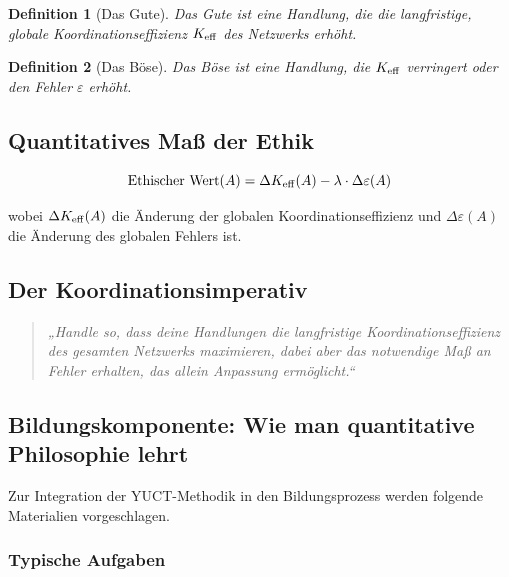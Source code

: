 \documentclass[12pt,a4paper]{article}
\newcommand{\eps}{\varepsilon}
\newtheorem{definition}{Definition}[section]
\begin{document}
	\begin{definition}[Das Gute]
		Das Gute ist eine Handlung, die die langfristige, globale Koordinationseffizienz \(\Keff\) des Netzwerks erhöht.
	\end{definition}
	
	\begin{definition}[Das Böse]
		Das Böse ist eine Handlung, die \(\Keff\) verringert oder den Fehler \(\eps\) erhöht.
	\end{definition}
	
	\subsection{Quantitatives Maß der Ethik}
	
	\begin{equation}
		\text{Ethischer Wert}(A) = \Delta \Keff(A) - \lambda \cdot \Delta \eps(A)
	\end{equation}
	
	wobei \(\Delta \Keff(A)\) die Änderung der globalen Koordinationseffizienz und \(\Delta \eps(A)\) die Änderung des globalen Fehlers ist.
	
	\subsection{Der Koordinationsimperativ}
	
	\begin{quote}
		\textit{„Handle so, dass deine Handlungen die langfristige Koordinationseffizienz des gesamten Netzwerks maximieren, dabei aber das notwendige Maß an Fehler erhalten, das allein Anpassung ermöglicht.“}
	\end{quote}
	
	\subsection{Bildungskomponente: Wie man quantitative Philosophie lehrt}
	\label{sec:educational}
	
	Zur Integration der YUCT-Methodik in den Bildungsprozess werden folgende Materialien vorgeschlagen.
	
	\subsubsection{Typische Aufgaben}
	
\end{document}
